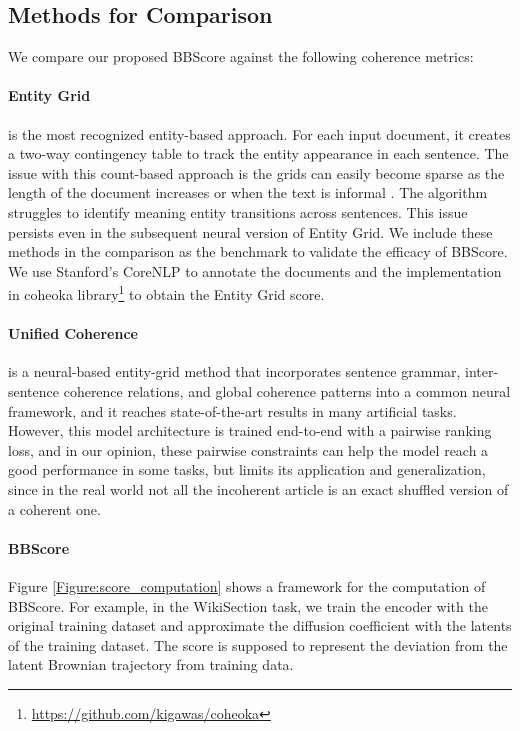 \documentclass[letterpaper]{article}
\begin{document}
\subsection{Methods for Comparison}
We compare our proposed BBScore against the following coherence metrics:

\paragraph{Entity Grid} \citet{barzilay-lapata-2005-modeling} is the most recognized entity-based approach. For each input document, it creates a two-way contingency table to track the entity appearance in each sentence. The issue with this count-based approach is the grids can easily become sparse as the length of the document increases or when the text is informal \citep{lai-tetreault-2018-discourse}. The algorithm struggles to identify meaning entity transitions across sentences. This issue persists even in the subsequent neural version of Entity Grid. We include these methods in the comparison as the benchmark to validate the efficacy of BBScore. We use Stanford's CoreNLP to annotate the documents and the implementation in coheoka library\footnote[1]{\url{https://github.com/kigawas/coheoka}} to obtain the Entity Grid score.
\paragraph{Unified Coherence} \citet{moon-etal-2019-unified} is a neural-based entity-grid method that incorporates sentence grammar, inter-sentence coherence relations, and global coherence patterns into a common neural framework, and it reaches state-of-the-art results in many artificial tasks. However, this model architecture is trained end-to-end with a pairwise ranking loss, and in our opinion, these pairwise constraints can help the model reach a good performance in some tasks, but limits its application and generalization, since in the real world not all the incoherent article is an exact shuffled version of a coherent one.
\paragraph{BBScore} Figure \ref{Figure:score_computation} shows a framework for the computation of BBScore. For example, in the WikiSection task, we train the encoder with the original training dataset and approximate the diffusion coefficient with the latents of the training dataset. The score is supposed to represent the deviation from the latent Brownian trajectory from training data.
\end{document}
